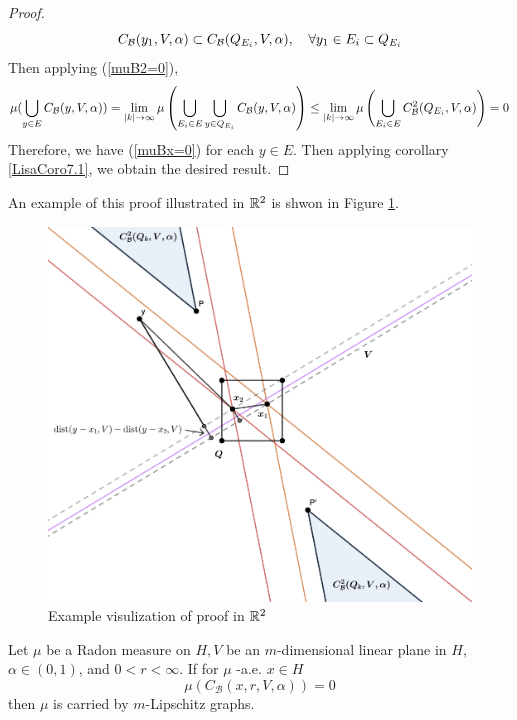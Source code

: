 \begin{proof}
\begin{equation}\label{eq:CysubsetCQ}
    C_{\mathcal B}(y_1, V, \alpha)\subset C_\mathcal B(Q_{E_i}, V, \alpha),\quad \forall y_1\in E_i \subset Q_{E_i}
\end{equation}
Then applying (\ref{muB2=0}), 
\begin{equation*}
    \begin{split}
        \mu(\bigcup_{y\in E}C_\mathcal B(y, V, \alpha))
        = \lim_{|k|\rightarrow \infty}\mu\left( \bigcup_{E_i\in E}\bigcup_{y\in Q_{E_i}} C_\mathcal B(y, V, \alpha) \right)  
        \leq \lim_{|k|\rightarrow\infty}\mu\left( \bigcup_{E_i\in E} C_\mathcal B^2(Q_{E_i}, V, \alpha) \right)
        = 0
    \end{split}
\end{equation*}
Therefore, we have (\ref{muBx=0}) for each $y\in E$. Then applying corollary \ref{LisaCoro7.1}, we obtain the desired result. 
\end{proof}



An example of this proof illustrated in $\mathbb{R}^2$ is shwon in Figure \ref{fig:CB1=CB2}.

\begin{figure}[H]
    \centering
    \includegraphics[width=.6\textwidth]{images/CB1=CB2.png}
    \caption{Example visulization of proof in $\mathbb{R}^2$}
    \label{fig:CB1=CB2}
\end{figure}


\begin{corollary}\label{LisaCoro7.1}
    Let $\mu$ be a Radon measure on $H, V$ be an $m$-dimensional linear plane in $H$, $\alpha \in(0,1)$, and $0<r<\infty$. If for $\mu$ -a.e. $x \in H$
   $$
   \mu\left(C_{\mathcal{B}}(x, r, V, \alpha)\right)=0
   $$
   then $\mu$ is carried by $m$-Lipschitz graphs.
\end{corollary}




